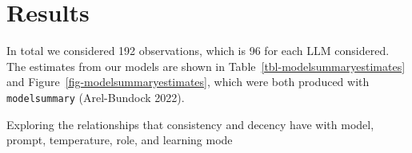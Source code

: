 \documentclass[
  letterpaper,
  DIV=11,
  numbers=noendperiod]{scrartcl}
\begin{document}
\hypertarget{sec-results}{%
\section{Results}\label{sec-results}}

In total we considered 192 observations, which is 96 for each LLM
considered. The estimates from our models are shown in
Table~\ref{tbl-modelsummaryestimates} and
Figure~\ref{fig-modelsummaryestimates}, which were both produced with
\texttt{modelsummary} (Arel-Bundock 2022).

\hypertarget{tbl-modelsummaryestimates}{}
\begin{table}
\caption{\label{tbl-modelsummaryestimates}Exploring the relationships that consistency and decency have with
model, prompt, temperature, role, and learning mode }\tabularnewline


\end{table}
\end{document}
